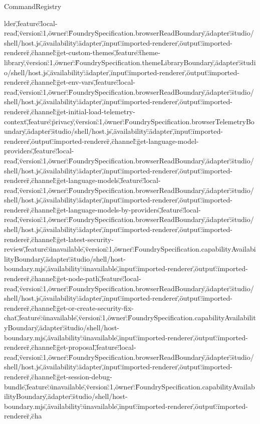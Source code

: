 \begin{lexlean}{CommandRegistry}
\begin{semanticmodule}
{lder\",\"feature\":\"local-read\",\"version\":1,\"owner\":\"FoundrySpecification.browserReadBoundary\",\"adapter\":\"studio/shell/host.js\",\"availability\":\"adapter\",\"input\":\"imported-renderer\",\"output\":\"imported-renderer\"},{\"channel\":\"get-custom-themes\",\"feature\":\"theme-library\",\"version\":1,\"owner\":\"FoundrySpecification.themeLibraryBoundary\",\"adapter\":\"studio/shell/host.js\",\"availability\":\"adapter\",\"input\":\"imported-renderer\",\"output\":\"imported-renderer\"},{\"channel\":\"get-env-vars\",\"feature\":\"local-read\",\"version\":1,\"owner\":\"FoundrySpecification.browserReadBoundary\",\"adapter\":\"studio/shell/host.js\",\"availability\":\"adapter\",\"input\":\"imported-renderer\",\"output\":\"imported-renderer\"},{\"channel\":\"get-initial-load-telemetry-context\",\"feature\":\"privacy\",\"version\":1,\"owner\":\"FoundrySpecification.browserTelemetryBoundary\",\"adapter\":\"studio/shell/host.js\",\"availability\":\"adapter\",\"input\":\"imported-renderer\",\"output\":\"imported-renderer\"},{\"channel\":\"get-language-model-providers\",\"feature\":\"local-read\",\"version\":1,\"owner\":\"FoundrySpecification.browserReadBoundary\",\"adapter\":\"studio/shell/host.js\",\"availability\":\"adapter\",\"input\":\"imported-renderer\",\"output\":\"imported-renderer\"},{\"channel\":\"get-language-models\",\"feature\":\"local-read\",\"version\":1,\"owner\":\"FoundrySpecification.browserReadBoundary\",\"adapter\":\"studio/shell/host.js\",\"availability\":\"adapter\",\"input\":\"imported-renderer\",\"output\":\"imported-renderer\"},{\"channel\":\"get-language-models-by-providers\",\"feature\":\"local-read\",\"version\":1,\"owner\":\"FoundrySpecification.browserReadBoundary\",\"adapter\":\"studio/shell/host.js\",\"availability\":\"adapter\",\"input\":\"imported-renderer\",\"output\":\"imported-renderer\"},{\"channel\":\"get-latest-security-review\",\"feature\":\"unavailable\",\"version\":1,\"owner\":\"FoundrySpecification.capabilityAvailabilityBoundary\",\"adapter\":\"studio/shell/host-boundary.mjs\",\"availability\":\"unavailable\",\"input\":\"imported-renderer\",\"output\":\"imported-renderer\"},{\"channel\":\"get-node-path\",\"feature\":\"local-read\",\"version\":1,\"owner\":\"FoundrySpecification.browserReadBoundary\",\"adapter\":\"studio/shell/host.js\",\"availability\":\"adapter\",\"input\":\"imported-renderer\",\"output\":\"imported-renderer\"},{\"channel\":\"get-or-create-security-fix-chat\",\"feature\":\"unavailable\",\"version\":1,\"owner\":\"FoundrySpecification.capabilityAvailabilityBoundary\",\"adapter\":\"studio/shell/host-boundary.mjs\",\"availability\":\"unavailable\",\"input\":\"imported-renderer\",\"output\":\"imported-renderer\"},{\"channel\":\"get-proposal\",\"feature\":\"local-read\",\"version\":1,\"owner\":\"FoundrySpecification.browserReadBoundary\",\"adapter\":\"studio/shell/host.js\",\"availability\":\"adapter\",\"input\":\"imported-renderer\",\"output\":\"imported-renderer\"},{\"channel\":\"get-session-debug-bundle\",\"feature\":\"unavailable\",\"version\":1,\"owner\":\"FoundrySpecification.capabilityAvailabilityBoundary\",\"adapter\":\"studio/shell/host-boundary.mjs\",\"availability\":\"unavailable\",\"input\":\"imported-renderer\",\"output\":\"imported-renderer\"},{\"cha}
\end{semanticmodule}
\end{lexlean}
